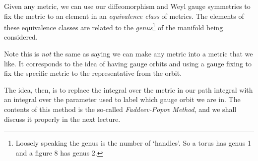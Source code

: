 \bcl 
    Given any metric, we can use our diffeomorphism and Weyl gauge symmetries to fix the metric to an element in an \textit{equivalence class} of metrics. The elements of these equivalence classes are related to the \textit{genus}\footnote{Loosely speaking the genus is the number of `handles'. So a torus has genus 1 and a figure 8 has genus 2.} of the manifold being considered. 
\ecl 

\br 
    Note this is \textit{not} the same as saying we can make any metric into a metric that we like. It corresponds to the idea of having gauge orbits and using a gauge fixing to fix the specific metric to the representative from the orbit. 
\er 

The idea, then, is to replace the integral over the metric in our path integral with an integral over the parameter used to label which gauge orbit we are in. The contents of this method is the so-called \textit{Faddeev-Popov Method}, and we shall discuss it properly in the next lecture. 